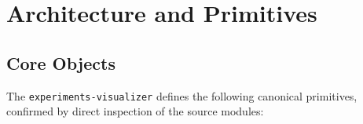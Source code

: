 
\section{Architecture and Primitives}
\label{sec:experiments-visualizer-arch}

\subsection{Core Objects}
\label{sec:experiments-visualizer-arch-objects}

The \texttt{experiments-visualizer} defines the following canonical primitives, confirmed by
direct inspection of the source modules:

